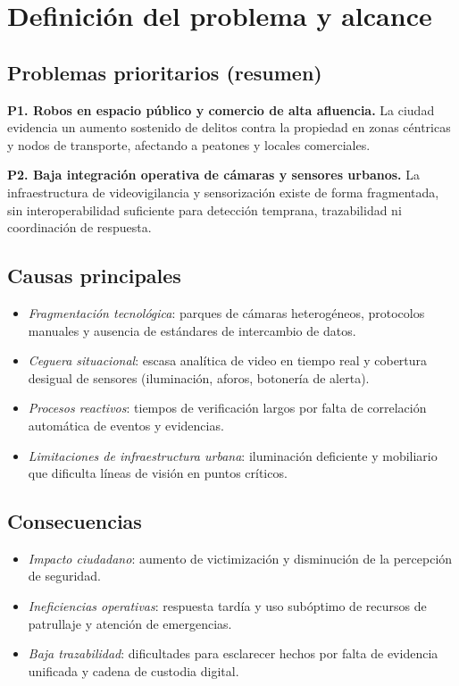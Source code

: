 \documentclass[12pt,a4paper]{article}
\begin{document}
\section{Definición del problema y alcance}

\subsection*{Problemas prioritarios (resumen)}
\textbf{P1. Robos en espacio público y comercio de alta afluencia.} La ciudad evidencia un aumento sostenido de delitos contra la propiedad en zonas céntricas y nodos de transporte, afectando a peatones y locales comerciales.

\textbf{P2. Baja integración operativa de cámaras y sensores urbanos.} La infraestructura de videovigilancia y sensorización existe de forma fragmentada, sin interoperabilidad suficiente para detección temprana, trazabilidad ni coordinación de respuesta.

\subsection*{Causas principales}
\begin{itemize}
    \item \textit{Fragmentación tecnológica}: parques de cámaras heterogéneos, protocolos manuales y ausencia de estándares de intercambio de datos.
    \item \textit{Ceguera situacional}: escasa analítica de video en tiempo real y cobertura desigual de sensores (iluminación, aforos, botonería de alerta).
    \item \textit{Procesos reactivos}: tiempos de verificación largos por falta de correlación automática de eventos y evidencias.
    \item \textit{Limitaciones de infraestructura urbana}: iluminación deficiente y mobiliario que dificulta líneas de visión en puntos críticos.
\end{itemize}

\subsection*{Consecuencias}
\begin{itemize}
    \item \textit{Impacto ciudadano}: aumento de victimización y disminución de la percepción de seguridad.
    \item \textit{Ineficiencias operativas}: respuesta tardía y uso subóptimo de recursos de patrullaje y atención de emergencias.
    \item \textit{Baja trazabilidad}: dificultades para esclarecer hechos por falta de evidencia unificada y cadena de custodia digital.
\end{itemize}
\end{document}
